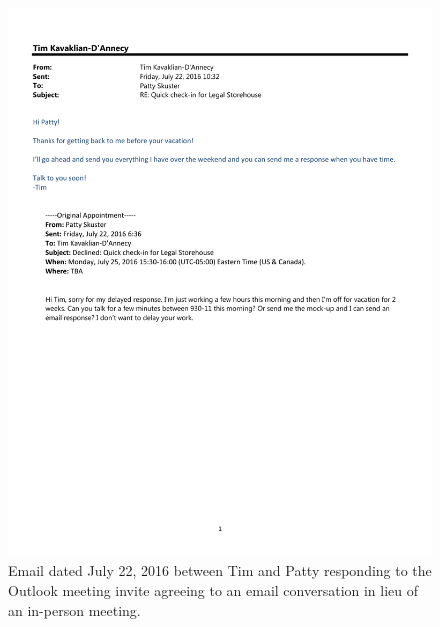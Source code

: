 \begin{figure}
  \centering
  \noindent\includegraphics[page=1,angle=-90,origin=c,width=.75\textwidth,height=.75\textheight]{documents/2016-07-22-Email-Patty-Tim}
 \caption{Email dated July 22, 2016 between Tim and Patty responding to the Outlook meeting invite agreeing to an email conversation in lieu of an in-person meeting.}
 \label{fig:2016-07-22-Email-Patty-Tim}
\end{figure}

